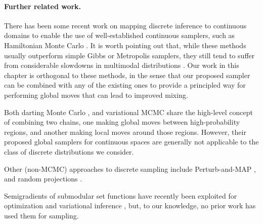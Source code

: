 \paragraph{Further related work.}
There has been some recent work on mapping discrete inference to continuous domains \citep{zhang12, pakman13, dinh17, nishimura18} to enable the use of well-established continuous samplers, such as Hamiltonian Monte Carlo \citep{neal12, betancourt17}.
It is worth pointing out that, while these methods usually outperform simple Gibbs or Metropolis samplers, they still tend to suffer from considerable slowdowns in multimodal distributions \citep{neal12}.
Our work in this chapter is orthogonal to these methods, in the sense that our proposed sampler can be combined with any of the existing ones to provide a principled way for performing global moves that can lead to improved mixing.

Both darting Monte Carlo \citep{sminchisescu07,ahn13}, and variational MCMC \citep{defreitas01} share the high-level concept of combining two chains, one making global moves between high-probability regions, and another making local moves around those regions.
However, their proposed global samplers for continuous spaces are generally not applicable to the class of discrete distributions we consider.

Other (non-MCMC) approaches to discrete sampling include Perturb-and-MAP \citep{papandreou11,hazan13}, and random projections \citep{zhu15}.

Semigradients of submodular set functions have recently been exploited for optimization \citep{iyer13, jegelka11} and variational inference \citep{djolonga16}, but, to our knowledge, no prior work  has used them for sampling.